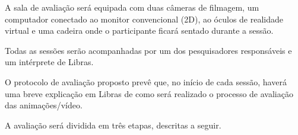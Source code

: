 \documentclass[a4paper,11pt,titlepage,singlespacing]{article}
\begin{document}

A sala de avaliação será equipada com duas câmeras de filmagem, um computador conectado ao monitor convencional (2D), ao óculos de realidade virtual e uma cadeira onde o participante ficará sentado durante a sessão.

Todas as sessões serão acompanhadas por um dos pesquisadores responsáveis e um intérprete de Libras.

O protocolo de avaliação proposto prevê que, no início de cada sessão, haverá uma breve explicação em Libras de como será realizado o processo de avaliação das animações/vídeo.

A avaliação será dividida em três etapas, descritas a seguir.
\end{document}
